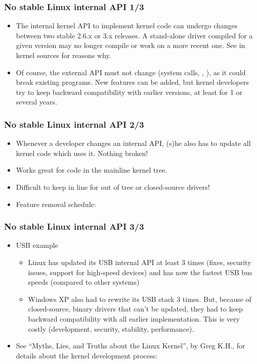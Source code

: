 \begin{frame}
  \frametitle{No stable Linux internal API 1/3}
  \begin{itemize}
  \item The internal kernel API to implement kernel code can undergo
    changes between two stable 2.6.x or 3.x releases. A stand-alone
    driver compiled for a given version may no longer compile or work
    on a more recent one. See
     in kernel sources for
    reasons why.
  \item Of course, the external API must not change (system calls,
    , ), as it could break existing
    programs. New features can be added, but kernel developers try to
    keep backward compatibility with earlier versions, at least for 1
    or several years.
  \end{itemize}
\end{frame}

\begin{frame}
  \frametitle{No stable Linux internal API 2/3}  
  \begin{itemize}
  \item Whenever a developer changes an internal API, (s)he also has
    to update all kernel code which uses it. Nothing broken!
  \item Works great for code in the mainline kernel tree.
  \item Difficult to keep in line for out of tree or closed-source
    drivers!
  \item Feature removal schedule:
  \end{itemize}
\end{frame}

\begin{frame}
  \frametitle{No stable Linux internal API 3/3}
  \begin{itemize}
  \item USB example
    \begin{itemize}
    \item Linux has updated its USB internal API at least 3 times
      (fixes, security issues, support for high-speed devices) and has
      now the fastest USB bus speeds (compared to other systems)
    \item Windows XP also had to rewrite its USB stack 3 times. But,
      because of closed-source, binary drivers that can't be updated,
      they had to keep backward compatibility with all earlier
      implementation. This is very costly (development, security,
      stability, performance).
    \end{itemize}
  \item See “Myths, Lies, and Truths about the Linux Kernel”, by Greg
    K.H., for details about the kernel development process:
  \end{itemize}
\end{frame}

